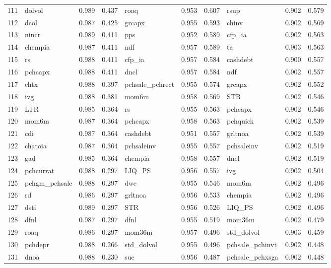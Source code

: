 \documentclass[12pt]{article}
\begin{document}
\begin{landscape}
\begin{footnotesize}
\begin{longtable}{l|lcc|lcc|lcc}
  111 & dolvol & 0.989 & 0.437 & roaq & 0.953 & 0.607 & rsup & 0.902 & 0.579 \\ 
  112 & dcol & 0.987 & 0.425 & grcapx & 0.955 & 0.593 & chinv & 0.902 & 0.569 \\ 
  113 & nincr & 0.989 & 0.411 & pps & 0.952 & 0.589 & cfp\_ia & 0.902 & 0.563 \\ 
  114 & chempia & 0.987 & 0.411 & ndf & 0.957 & 0.589 & ta & 0.903 & 0.563 \\ 
  115 & rs & 0.988 & 0.411 & cfp\_ia & 0.957 & 0.584 & cashdebt & 0.900 & 0.557 \\ 
  116 & pchcapx & 0.988 & 0.411 & dncl & 0.957 & 0.584 & ndf & 0.902 & 0.557 \\ 
  117 & chtx & 0.988 & 0.397 & pchsale\_pchrect & 0.955 & 0.574 & grcapx & 0.902 & 0.552 \\ 
  118 & ivg & 0.988 & 0.381 & mom6m & 0.958 & 0.569 & STR & 0.902 & 0.546 \\ 
  119 & LTR & 0.985 & 0.364 & rs & 0.955 & 0.563 & pchcapx & 0.902 & 0.546 \\ 
  120 & mom6m & 0.987 & 0.364 & pchcapx & 0.958 & 0.563 & pchquick & 0.902 & 0.539 \\ 
  121 & cdi & 0.987 & 0.364 & cashdebt & 0.951 & 0.557 & grltnoa & 0.902 & 0.539 \\ 
  122 & chatoia & 0.987 & 0.364 & pchsaleinv & 0.955 & 0.557 & pchsaleinv & 0.902 & 0.519 \\ 
  123 & gad & 0.985 & 0.364 & chempia & 0.958 & 0.557 & dncl & 0.902 & 0.519 \\ 
  124 & pchcurrat & 0.988 & 0.297 & LIQ\_PS & 0.956 & 0.557 & ivg & 0.902 & 0.504 \\ 
  125 & pchgm\_pchsale & 0.988 & 0.297 & dwc & 0.955 & 0.546 & mom6m & 0.902 & 0.496 \\ 
  126 & rd & 0.986 & 0.297 & grltnoa & 0.956 & 0.533 & chempia & 0.902 & 0.496 \\ 
  127 & dsti & 0.989 & 0.297 & STR & 0.956 & 0.526 & LIQ\_PS & 0.902 & 0.496 \\ 
  128 & dfnl & 0.987 & 0.297 & dfnl & 0.955 & 0.519 & mom36m & 0.902 & 0.479 \\ 
  129 & roaq & 0.986 & 0.297 & mom36m & 0.957 & 0.496 & std\_dolvol & 0.903 & 0.459 \\ 
  130 & pchdepr & 0.988 & 0.266 & std\_dolvol & 0.955 & 0.496 & pchsale\_pchinvt & 0.902 & 0.448 \\ 
  131 & dnoa & 0.988 & 0.230 & sue & 0.956 & 0.487 & pchsale\_pchxsga & 0.902 & 0.448 \\ 

\end{longtable}
\end{footnotesize}
\end{landscape}
\end{document}
